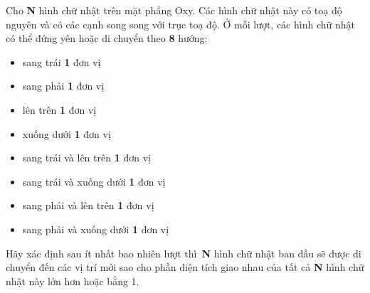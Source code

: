 Cho \textbf{N} hình chữ nhật trên mặt phẳng Oxy. Các hình chữ nhật này có toạ độ nguyên và có các cạnh song song với trục toạ độ. Ở mỗi lượt, các hình chữ nhật có thể đứng yên hoặc di chuyển theo \textbf{8} hướng:
\begin{itemize}
	\item sang trái \textbf{1} đơn vị
	\item sang phải \textbf{1} đơn vị
	\item lên trên \textbf{1} đơn vị
	\item xuống dưới \textbf{1} đơn vị
	\item sang trái và lên trên \textbf{1} đơn vị
	\item sang trái và xuống dưới \textbf{1} đơn vị
	\item sang phải và lên trên \textbf{1} đơn vị
	\item sang phải và xuống dưới \textbf{1} đơn vị
\end{itemize}

Hãy xác định sau ít nhất bao nhiên lượt thì \textbf{N} hình chữ nhật ban đầu sẽ được di chuyển đến các vị trí mới sao cho phần diện tích giao nhau của tất cả \textbf{N} hình chữ nhật này lớn hơn hoặc bằng 1.